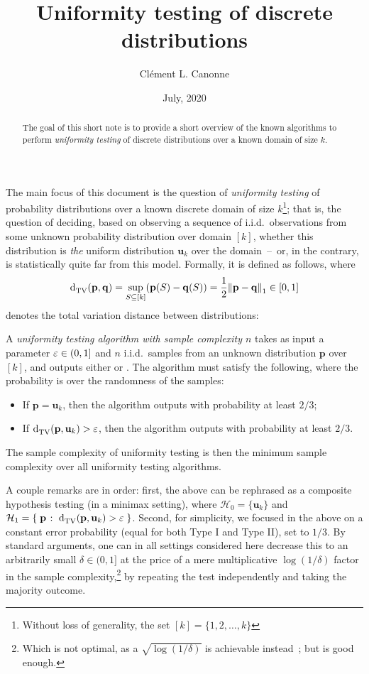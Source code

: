 \documentclass[10pt]{article}
\title{Uniformity testing of discrete distributions}
\date{July, 2020}
\author{Cl\'ement L. Canonne}
\newcommand{\dst}{\eps}
\newcommand{\ab}{k}
\newcommand{\ns}{n}
\newcommand{\errproba}{\delta}
\newcommand{\p}{\mathbf{p}}
\newcommand{\q}{\mathbf{q}}
\renewcommand{\uniform}{\mathbf{u}}
\begin{document}
\maketitle

\begin{abstract}
The goal of this short note is to provide a short overview of the known algorithms to perform \emph{uniformity testing} of discrete distributions over a known domain of size $\ab$.
\end{abstract}

The main focus of this document is the question of \emph{uniformity testing} of probability distributions over a known discrete domain of size $\ab$\footnote{Without loss of generality, the set $[\ab]=\{1,2,\dots,\ab\}$}; that is, the question of deciding, based on observing a sequence of i.i.d.\ observations from some unknown probability distribution over domain $[\ab]$, whether this distribution is \emph{the} uniform distribution $\uniform_\ab$ over the domain~--~or, in the contrary, is statistically quite far from this model. Formally, it is defined as follows, where 
\[
    \totalvardist{\p}{\q} = \sup_{S\subseteq[\ab]}(\p(S)-\q(S)) = \frac{1}{2}\normone{\p-\q} \in[0,1]
\]
denotes the total variation distance between distributions:
\begin{definition}
  A \emph{uniformity testing algorithm with sample complexity $\ns$} takes as input a parameter $\dst \in(0,1]$ and $\ns$ i.i.d.\ samples from an unknown distribution $\p$ over $[\ab]$, and outputs either \accept or \reject. The algorithm must satisfy the following, where the probability is over the randomness of the samples:
  \begin{itemize}
    \item If $\p=\uniform_\ab$, then the algorithm outputs \accept with probability at least $2/3$;
    \item If $\totalvardist{\p}{\uniform_\ab}>\dst$, then the algorithm outputs \reject with probability at least $2/3$.
  \end{itemize}
The sample complexity of uniformity testing is then the minimum sample complexity over all uniformity testing algorithms.
\end{definition}
A couple remarks are in order: first, the above can be rephrased as a composite hypothesis testing (in a minimax setting), where $\mathcal{H}_0 = \{\uniform_\ab\}$ and $\mathcal{H}_1 = \setOfSuchThat{\p}{\totalvardist{\p}{\uniform_\ab} > \dst}$. Second, for simplicity, we focused in the above on a constant error probability (equal for both Type I and Type II), set to $1/3$. By standard arguments, one can in all settings considered here decrease this to an arbitrarily small $\errproba\in(0,1]$ at the price of a mere multiplicative $\log(1/\errproba)$ factor in the sample complexity,\footnote{Which is not optimal, as a $\sqrt{\log(1/\errproba)}$ is achievable instead~\cite{HuangM13,DiakonikolasGPP18}; but is good enough.} by repeating the test independently and taking the majority outcome.
\end{document}
